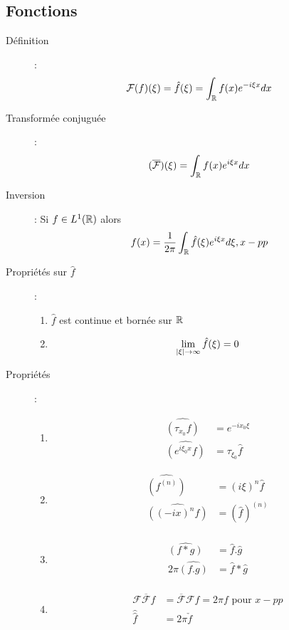 \subsection{Fonctions}
\begin{description}
\item[Définition] :
    \[
        \mathcal F(f)(\xi)
        =\hat f(\xi)
        =\int_{\mathbb{R}} f(x)e^{-i\xi x}dx
    \]
\item[Transformée conjuguée] :
    \[
        (\mathcal{\overline{F}})(\xi)=\int_{\mathbb{R}} f(x)e^{i\xi x}dx
    \]
\item[Inversion] : Si $f\in L^1(\mathbb{R})$ alors
    \[
        f(x)=\frac{1}{2\pi}\int_{\mathbb{R}} \hat f(\xi)e^{i\xi x}d\xi, x-pp
    \]
\item[Propriétés sur $\hat f$] :
\begin{enumerate}
    \item $\hat f$ est continue et bornée sur $\mathbb{R}$
    \item
    \[ \lim_{|\xi|\rightarrow\infty}\hat f(\xi)=0 \]
\end{enumerate}
\item[Propriétés] : 
\begin{multicols}{2}
    \begin{enumerate}
        \item \begin{align*}
            \widehat{(\tau_{x_0}f)}&=e^{-ix_0\xi}\\
            \widehat{(e^{i\xi_0x}f)}&=\tau_{\xi_0}\hat f
        \end{align*}
        \item\begin{align*}
            \widehat{(f^{(n)})}&=(i\xi)^n\hat f\\
            \widehat{((-ix)^nf)}&=(\hat f)^{(n)}\\
        \end{align*}
        \item\begin{align*}
            \widehat{(f*g)}&=\hat f.\hat g\\
            2\pi\widehat{(f.g)}&=\hat f*\hat g\\
        \end{align*}
        \item\begin{align*}
            \mathcal F\overline{\mathcal F}f&
            =\overline{\mathcal F}\mathcal Ff
            =2\pi f\textrm{ pour }x-pp\\
            \widehat{\widehat{f}}&=2\pi\check f\\
        \end{align*}
    \end{enumerate}
\end{multicols}
\end{description}
